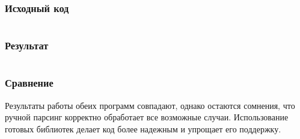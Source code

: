 \subsubsection{Исходный код}
\inputminted[breaklines]{python}{../task_2.py}

\subsubsection{Результат}
\inputminted[breaklines]{js}{../schedule_2.json}

\subsubsection{Сравнение}
Результаты работы обеих программ совпадают, однако остаются сомнения, что ручной парсинг корректно обработает все возможные случаи. Использование готовых библиотек делает код более надежным и упрощает его поддержку.

